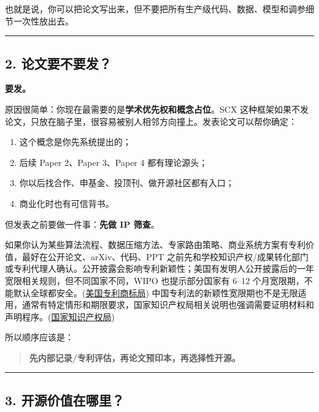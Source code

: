 \documentclass[
  12pt,
]{ctexart}
\providecommand{\tightlist}{%
  \setlength{\itemsep}{0pt}\setlength{\parskip}{0pt}}
\begin{document}
也就是说，你可以把论文写出来，但不要把所有生产级代码、数据、模型和调参细节一次性放出去。

\begin{center}\rule{0.5\linewidth}{0.5pt}\end{center}

\subsection{2.
论文要不要发？}\label{ux8bbaux6587ux8981ux4e0dux8981ux53d1}

\textbf{要发。}

原因很简单：你现在最需要的是\textbf{学术优先权和概念占位}。SCX
这种框架如果不发论文，只放在脑子里，很容易被别人相邻方向撞上。发表论文可以帮你确定：

\begin{enumerate}
\def\labelenumi{\arabic{enumi}.}
\tightlist
\item
  这个概念是你先系统提出的；
\item
  后续 Paper 2、Paper 3、Paper 4 都有理论源头；
\item
  你以后找合作、申基金、投顶刊、做开源社区都有入口；
\item
  商业化时也有可信背书。
\end{enumerate}

但发表之前要做一件事：\textbf{先做 IP 筛查}。

如果你认为某些算法流程、数据压缩方法、专家路由策略、商业系统方案有专利价值，最好在公开论文、arXiv、代码、PPT
之前先和学校知识产权/成果转化部门或专利代理人确认。公开披露会影响专利新颖性；美国有发明人公开披露后的一年宽限相关规则，但不同国家不同，WIPO
也提示部分国家有 6--12
个月宽限期，不能默认全球都安全。(\href{https://www.uspto.gov/web/offices/pac/mpep/s2153.html?utm_source=chatgpt.com}{美国专利商标局})
中国专利法的新颖性宽限期也不是无限适用，通常有特定情形和期限要求，国家知识产权局相关说明也强调需要证明材料和声明程序。(\href{https://www.cnipa.gov.cn/art/2021/12/3/art_2650_171861.html?utm_source=chatgpt.com}{国家知识产权局})

所以顺序应该是：

\begin{quote}
\textbf{先内部记录/专利评估，再论文预印本，再选择性开源。}
\end{quote}

\begin{center}\rule{0.5\linewidth}{0.5pt}\end{center}

\subsection{3.
开源价值在哪里？}\label{ux5f00ux6e90ux4ef7ux503cux5728ux54eaux91cc}
\end{document}
